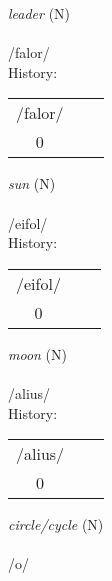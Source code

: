 \vspace{20pt}\hline



\vspace{30pt}
 \textit{leader} (N)\\
\\
\noindent /f{\textprimstress}alor/\\


\noindent History:
\begin{tabular}{ccc}
/falor/\\
0\\
\end{tabular}

\vspace{20pt}\hline



\vspace{30pt}
 \textit{sun} (N)\\
\\
\noindent /e{\textprimstress}ifol/\\


\noindent History:
\begin{tabular}{ccc}
/eifol/\\
0\\
\end{tabular}

\vspace{20pt}\hline



\vspace{30pt}
 \textit{moon} (N)\\
\\
\noindent /al{\textprimstress}ius/\\


\noindent History:
\begin{tabular}{ccc}
/alius/\\
0\\
\end{tabular}

\vspace{20pt}\hline



\vspace{30pt}
 \textit{circle/cycle} (N)\\
\\
\noindent /{}{\textprimstress}o{}/\\


